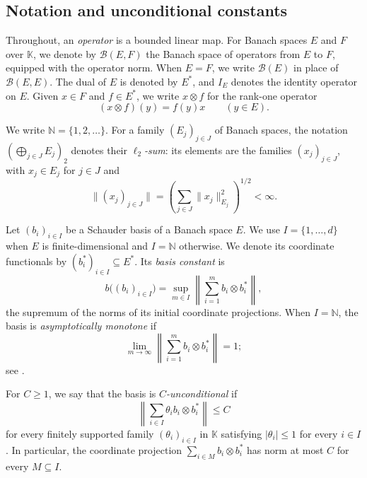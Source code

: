 \documentclass[11pt,a4paper,reqno]{amsart}
\theoremstyle{definition}
\newcommand{\N}{\mathbb N}
\newcommand{\norm}[1]{\lVert #1\rVert}
\numberwithin{equation}{section}
\begin{document}
\subsection{Notation and unconditional constants}
Throughout, an \emph{operator} is a bounded linear map. For Banach spaces $E$ and $F$ over $\mathbb K$, we denote by $\mathscr B(E,F)$ the Banach space of operators from $E$ to $F$, equipped with the operator norm. When $E=F$, we write $\mathscr B(E)$ in place of $\mathscr B(E,E)$. The dual of $E$ is denoted by $E^*$, and $I_E$ denotes the identity operator on $E$. Given $x\in F$ and $f\in E^*$, we write $x\otimes f$ for the rank-one operator 
\begin{equation*}
 (x\otimes f)(y)=f(y)x\qquad(y\in E).
\end{equation*}

We write $\N=\{1,2,\ldots\}$. For a family $(E_j)_{j\in J}$ of Banach spaces, the notation $(\bigoplus_{j\in J}E_j)_2$ denotes their \emph{$\ell_2$-sum}: its elements are the families $(x_j)_{j\in J}$, with $x_j\in E_j$ for $j\in J$ and
\begin{equation*}
 \norm{(x_j)_{j\in J}}
   =\left(\sum_{j\in J}\norm{x_j}_{E_j}^2\right)^{1/2}<\infty.
\end{equation*}

Let $(b_i)_{i\in I}$ be a Schauder basis of a Banach space $E$. We use $I=\{1,\ldots,d\}$ when $E$ is finite-dimensional and $I=\N$ otherwise. We denote its coordinate functionals by $(b_i^*)_{i\in I}\subseteq E^*$. Its \emph{basis constant} is
\begin{equation*}
 b\bigl((b_i)_{i\in I}\bigr)
   =\sup_{m\in I}\left\|\sum_{i=1}^m b_i\otimes b_i^*\right\|,
\end{equation*}
the supremum of the norms of its initial coordinate projections. When $I=\N$, the basis is \emph{asymptotically monotone} if
\begin{equation*}
 \lim_{m\to\infty}\left\|\sum_{i=1}^m b_i\otimes b_i^*\right\|=1;
\end{equation*}
see \cite[Section~1]{MujicaVieira2010}.

For $C\geq1$, we say that the basis is \emph{$C$-unconditional} if
\begin{equation*}
 \left\|\sum_{i\in I}\theta_i b_i\otimes b_i^*\right\|\leq C
\end{equation*}
for every finitely supported family $(\theta_i)_{i\in I}$ in $\mathbb K$ satisfying $|\theta_i|\leq1$ for every $i\in I$. In particular, the coordinate projection $\sum_{i\in M}b_i\otimes b_i^*$ has norm at most $C$ for every $M\subseteq I$.
\end{document}
